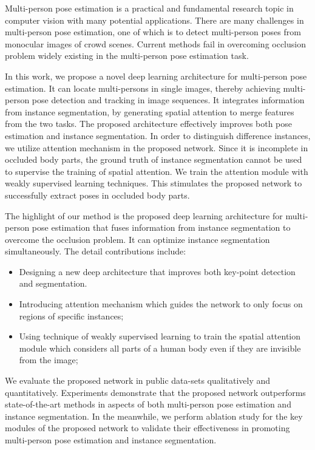 \begin{eabstract}
Multi-person pose estimation is a practical and fundamental research topic in computer vision with many potential applications. There are many challenges in multi-person pose estimation, one of which is to detect multi-person poses from monocular images of crowd scenes. Current methods fail in overcoming occlusion problem widely existing in the multi-person pose estimation task.

In this work, we propose a novel deep learning architecture for multi-person pose estimation. It can locate multi-persons in single images, thereby achieving multi-person pose detection and tracking in image sequences. It integrates information from instance segmentation, by generating spatial attention to merge features from the two tasks. The proposed architecture effectively improves both pose estimation and instance segmentation. In order to distinguish difference instances, we utilize attention mechanism in the proposed network. Since it is incomplete in occluded body parts, the ground truth of instance segmentation cannot be used to supervise the training of spatial attention. We train the attention module with weakly supervised learning techniques. This stimulates the proposed network to successfully extract poses in occluded body parts.

The highlight of our method is the proposed deep learning architecture for multi-person pose estimation that fuses information from instance segmentation to overcome the occlusion problem. It can optimize instance segmentation simultaneously. The detail contributions include:
\begin{itemize}
	\item Designing a new deep architecture that improves both key-point detection and segmentation.
	\item Introducing attention mechanism which guides the network to only focus on regions of specific instances;
	\item Using technique of weakly supervised learning to train the spatial attention module which considers all parts of a human body even if they are invisible from the image;
\end{itemize}

We evaluate the proposed network in public data-sets qualitatively and quantitatively. Experiments demonstrate that the proposed network outperforms state-of-the-art methods in aspects of both multi-person pose estimation and instance segmentation. In the meanwhile, we perform ablation study for the key modules of the proposed network to validate their effectiveness in promoting multi-person pose estimation and instance segmentation. 
\end{eabstract}

